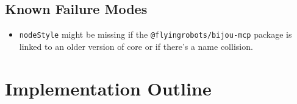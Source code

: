 \subsection{Known Failure Modes}\label{record-251-known-failure-modes}

\begin{itemize}
\tightlist
\item
  \texttt{n\allowbreak{}o\allowbreak{}d\allowbreak{}e\allowbreak{}S\allowbreak{}t\allowbreak{}y\allowbreak{}l\allowbreak{}e} might be missing if the \texttt{@\allowbreak{}f\allowbreak{}l\allowbreak{}y\allowbreak{}i\allowbreak{}n\allowbreak{}g\allowbreak{}r\allowbreak{}o\allowbreak{}b\allowbreak{}o\allowbreak{}t\allowbreak{}s\allowbreak{}/\allowbreak{}b\allowbreak{}i\allowbreak{}j\allowbreak{}o\allowbreak{}u\allowbreak{}-\allowbreak{}m\allowbreak{}c\allowbreak{}p} package is linked to an older version of core or if there's a name collision.
\end{itemize}

\section{Implementation Outline}\label{record-251-implementation-outline}

